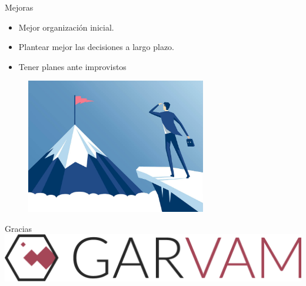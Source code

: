 \documentclass{beamer}
\begin{document}
\begin{frame}{Mejoras}
	\begin{itemize}
 	 \item {
  		Mejor organizaci\'on inicial.
 	 }
 	 \item {
  		Plantear mejor las decisiones a largo plazo.
 	 }
 	 \item {
		Tener planes ante improvistos
 	 }
 	
  \end{itemize}
  	\begin{figure}[H]
  		\includegraphics[width=0.7\textwidth, height=0.5\textheight]{images_latex/largoplazo}
  	\end{figure}
\end{frame}

\begin{frame}{Gracias}
	\centering
	\includegraphics[width=0.6\paperwidth, height = 0.2\paperheight]{images_latex/logo}
\end{frame}
\end{document}
